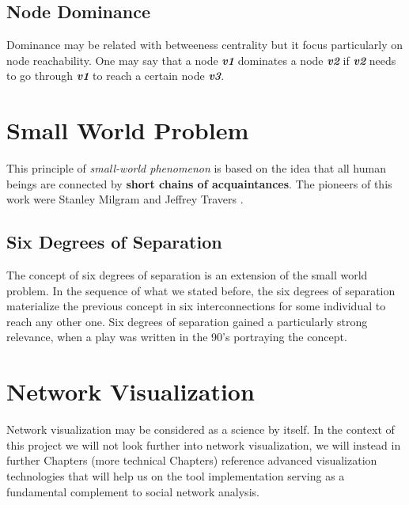 \subsection{Node Dominance}
Dominance may be related with betweeness centrality but it focus particularly on node reachability. One may say that a node \textit{\textbf{v1}} dominates
a node \textit{\textbf{v2}} if \textit{\textbf{v2}} needs to go through \textit{\textbf{v1}} to reach a certain node \textit{\textbf{v3}}.

\section{Small World Problem}
This principle of \textit{small-world phenomenon} is based on the idea that all human beings are connected by \textbf{short chains of acquaintances}. The pioneers of this work were Stanley Milgram and Jeffrey Travers \citep{travers1967small}.

\subsection*{Six Degrees of Separation}
The concept of six degrees of separation is an extension of the small world problem. In the sequence of what we stated before, the six degrees of separation materialize the previous concept in six interconnections for some individual to reach any other one. Six degrees of separation gained a particularly strong relevance, when a play was written in the 90's portraying the concept.

\section{Network Visualization}
Network visualization may be considered as a science by itself. In the context of this project we will not look further into network visualization, we will instead
in further Chapters (more technical Chapters) reference advanced visualization technologies that will help us on the tool implementation serving as a fundamental complement to social network analysis.

